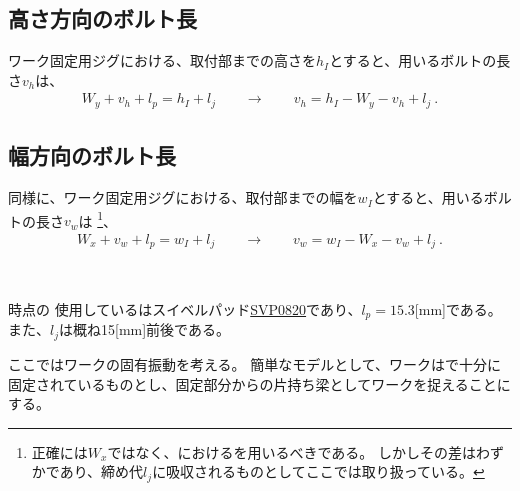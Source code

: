 \subsection{高さ方向のボルト長}
ワーク固定用ジグにおける、\FixtureBolt 取付部までの高さを$h_I$とすると、用いるボルトの長さ$v_h$は、
\begin{align*}
  W_y+v_h+l_p = h_I+l_j
  \qquad\longrightarrow\qquad
  v_h = h_I-W_y-v_h+l_j\ .
\end{align*}


\subsection{幅方向のボルト長}
同様に、ワーク固定用ジグにおける、\FixtureBolt 取付部までの幅を$w_I$とすると、用いるボルトの長さ$v_w$は
\footnote{正確には\ACOD$W_x$ではなく、\ReceiverPlate における\HorizontalOD を用いるべきである。
しかしその差はわずかであり、締め代$l_j$に吸収されるものとしてここでは取り扱っている。}、
\begin{align*}
  W_x+v_w+l_p = w_I+l_j
  \qquad\longrightarrow\qquad
  v_w = w_I-W_x-v_w+l_j\ .
\end{align*}

~\vfill
\begin{\Columnname}{\dateFixtureBolt 時点の\FixtureBolt}
使用している\FixtureBolt はスイベルパッド\href{https://www.nabeya.co.jp/pdf/9461.pdf}{SVP0820}であり、$l_p = 15.3$[mm]である。
また、$l_j$は概ね15[mm]前後である。
\end{\Columnname}




\clearpage
ここではワークの固有振動を考える。
簡単なモデルとして、ワークは\Jig で十分に固定されているものとし、固定部分からの片持ち梁としてワークを捉えることにする。

